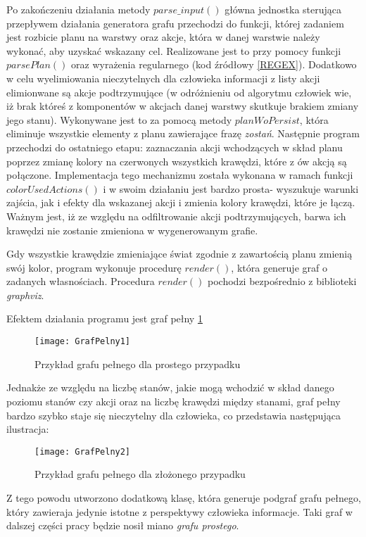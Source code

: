     Po zakończeniu działania metody $parse\_input()$ główna jednostka sterująca przepływem działania generatora grafu przechodzi do funkcji, której 
    zadaniem jest rozbicie planu na warstwy oraz akcje, która w danej warstwie należy wykonać, aby uzyskać wskazany cel. Realizowane jest to przy 
    pomocy funkcji $parsePlan()$ oraz wyrażenia regularnego (kod źródłowy \ref{REGEX}). Dodatkowo w celu wyelimiowania nieczytelnych dla człowieka informacji z 
    listy akcji elimionwane są akcje podtrzymujące (w odróżnieniu od algorytmu człowiek wie, iż brak któreś z komponentów w 
    akcjach danej warstwy skutkuje brakiem zmiany jego stanu). Wykonywane jest to za pomocą metody $planWoPersist$, która eliminuje wszystkie 
    elementy z planu zawierające frazę \textit{zostań}. 
    Następnie program przechodzi do ostatniego etapu: zaznaczania akcji wchodzących w skład planu poprzez zmianę kolory na czerwonych wszystkich 
    krawędzi, które z ów akcją są połączone. Implementacja tego mechanizmu została wykonana w ramach funkcji $colorUsedActions()$ i w swoim działaniu 
    jest bardzo prosta- wyszukuje warunki zajścia, jak i efekty dla wskazanej akcji i zmienia kolory krawędzi, które je łączą. Ważnym jest, iż ze 
    względu na odfiltrowanie akcji podtrzymujących, barwa ich krawędzi nie zostanie zmieniona w wygenerowanym grafie. 

    Gdy wszystkie krawędzie zmieniające świat zgodnie z zawartością planu zmienią swój kolor, program wykonuje procedurę $render()$, która 
    generuje graf o zadanych własnościach. Procedura $render()$ pochodzi bezpośrednio z biblioteki \textit{graphviz}.

    Efektem działania programu jest  graf pełny \ref{GrafPelny123}

    \begin{figure}[H]
        \texttt{[image: GrafPelny1]}
        \centering
        \caption{Przykład grafu pełnego dla prostego przypadku}
    \end{figure}
    Jednakże ze względu na liczbę stanów, jakie mogą wchodzić w skład danego poziomu stanów czy akcji oraz na liczbę krawędzi między stanami, graf 
    pełny bardzo szybko staje się nieczytelny dla człowieka, co przedstawia następująca ilustracja:
    \begin{figure}[H]
        \texttt{[image: GrafPelny2]}
        \centering
        \caption{Przykład grafu pełnego dla złożonego przypadku}
        \label{GrafPelny123}
    \end{figure}
    Z tego powodu utworzono dodatkową klasę, która generuje podgraf grafu pełnego, który zawieraja jedynie istotne z perspektywy człowieka informacje.
    Taki graf w dalszej części pracy będzie nosił miano \textit{grafu prostego}.

